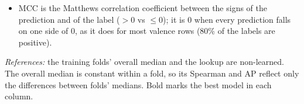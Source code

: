 \documentclass[11pt]{article}
\begin{document}
\begin{table}[!htbp]
{\begin{itemize}
  \item MCC is the Matthews correlation coefficient between the signs of the prediction and of the label ($>0$ vs $\le 0$); it is 0 when every prediction falls on one side of 0, as it does for most valence rows (80\% of the labels are positive).
\end{itemize}
\emph{References:} the training folds' overall median and the lookup are non-learned. The overall median is constant within a fold, so its Spearman and AP reflect only the differences between folds' medians. Bold marks the best model in each column.}
\end{table}
\end{document}
